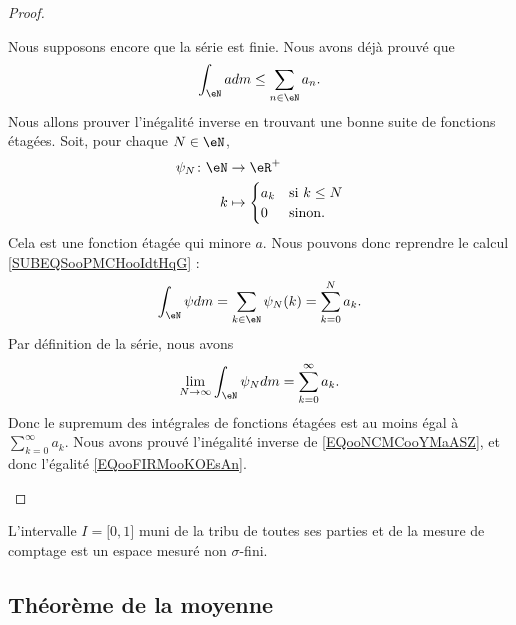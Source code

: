 \begin{proof}
\begin{subproof}
		Nous supposons encore que la série est finie. Nous avons déjà prouvé que
		\begin{equation}            \label{EQooNCMCooYMaASZ}
			\int_{\eN}adm\leq \sum_{n\in \eN}a_n.
		\end{equation}
		Nous allons prouver l'inégalité inverse en trouvant une bonne suite de fonctions étagées. Soit, pour chaque \( N\in \eN\),
		\begin{equation}
			\begin{aligned}
				\psi_N\colon \eN & \to \eR^+                        \\
				k                & \mapsto \begin{cases}
					                           a_k & \text{si } k\leq N \\
					                           0   & \text{sinon. }
				                           \end{cases}
			\end{aligned}
		\end{equation}
		Cela est une fonction étagée qui minore \( a\). Nous pouvons donc reprendre le calcul \eqref{SUBEQSooPMCHooIdtHqG} :
		\begin{equation}
			\int_{\eN}\psi dm=\sum_{k\in \eN}\psi_N(k)=\sum_{k=0}^Na_k.
		\end{equation}
		Par définition de la série, nous avons
		\begin{equation}
			\lim_{N\to \infty} \int_{\eN}\psi_N dm=\sum_{k=0}^{\infty}a_k.
		\end{equation}
		Donc le supremum des intégrales de fonctions étagées est au moins égal à \( \sum_{k=0}^{\infty}a_k\). Nous avons prouvé l'inégalité inverse de \eqref{EQooNCMCooYMaASZ}, et donc l'égalité \eqref{EQooFIRMooKOEsAn}.
	\end{subproof}
\end{proof}

\begin{example}     \label{EXooDMAUooWWVZbq}
	L'intervalle \( I=\mathopen[ 0 , 1 \mathclose]\) muni de la tribu de toutes ses parties et de la mesure de comptage est un espace mesuré non \( \sigma\)-fini.
\end{example}

\subsection{Théorème de la moyenne}

